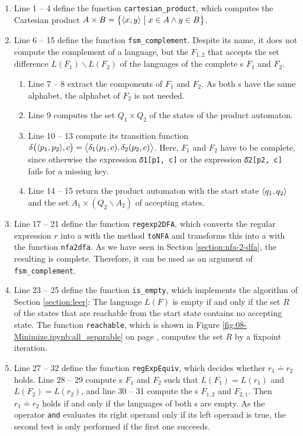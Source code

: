 \begin{enumerate}
\item Line 1 -- 4 define the function \texttt{cartesian\_product}, which computes the Cartesian product
      $A \times B = \bigl\{ \pair(x, y) \bigm| x \in A \wedge y \in B \bigr\}$.
\item Line 6 -- 15 define the function \texttt{fsm\_complement}.  Despite its name, it does not compute the
      complement of a language, but the  $F_{1,2}$ that accepts the set difference
      $L(F_1) \backslash L(F_2)$ of the languages of the complete s $F_1$ and $F_2$.
      \begin{enumerate}
      \item Line 7 -- 8 extract the components of $F_1$ and $F_2$.  As both s have the same
            alphabet, the alphabet of $F_2$ is not needed.
      \item Line 9 computes the set $Q_1 \times Q_2$ of the states of the product automaton.
      \item Line 10 -- 13 compute its transition function
            $\delta\bigl(\pair(p_1, p_2), c\bigr) = \bigl\langle \delta_1(p_1, c), \delta_2(p_2, c) \bigr\rangle$.
            Here, $F_1$ and $F_2$ have to be complete, since otherwise the expression \texttt{𝛿1[p1, c]} or the
            expression \texttt{𝛿2[p2, c]} fails for a missing key.
      \item Line 14 -- 15 return the product automaton with the start state $\pair(q_1, q_2)$ and the set
            $A_1 \times (Q_2 \backslash A_2)$ of accepting states.
      \end{enumerate}
\item Line 17 -- 21 define the function \texttt{regexp2DFA}, which converts the regular expression $r$ into a
       with the method \texttt{toNFA} and transforms this  into a 
      with the function \texttt{nfa2dfa}.  As we have seen in Section \ref{section:nfa-2-dfa}, the resulting
       is complete.  Therefore, it can be used as an argument of \texttt{fsm\_complement}.
\item Line 23 -- 25 define the function \texttt{is\_empty}, which implements the algorithm of Section
      \ref{section:leer}:  The language $L(F)$ is empty if and only if the set $R$ of the states that are reachable
      from the start state contains no accepting state.  The function \texttt{reachable}, which is shown in Figure
      \ref{fig:08-Minimize.ipynb:all_separable} on page \pageref{fig:08-Minimize.ipynb:all_separable}, computes the
      set $R$ by a fixpoint iteration.
\item Line 27 -- 32 define the function \texttt{regExpEquiv}, which decides whether $r_1 \doteq r_2$ holds.
      Line 28 -- 29 compute s $F_1$ and $F_2$ such that $L(F_1) = L(r_1)$ and $L(F_2) = L(r_2)$,
      and line 30 -- 31 compute the s $F_{1,2}$ and $F_{2,1}$.  Then $r_1 \doteq r_2$ holds if and
      only if the languages of both s are empty.  As the operator \texttt{and} evaluates its right
      operand only if its left operand is true, the second test is only performed if the first one succeeds.
\end{enumerate}
